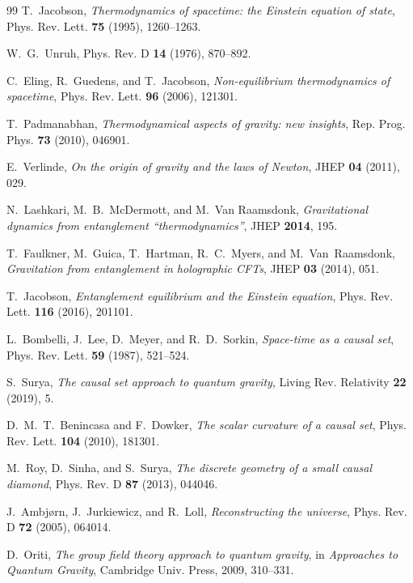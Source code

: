 \documentclass[11pt]{article}
\theoremstyle{definition}
\theoremstyle{remark}
\begin{document}
\begin{thebibliography}{99}\small
{}
T.~Jacobson, \emph{Thermodynamics of spacetime: the Einstein equation of state},
Phys. Rev. Lett. \textbf{75} (1995), 1260--1263.

W.~G.~Unruh,
Phys. Rev. D \textbf{14} (1976), 870--892.

C.~Eling, R.~Guedens, and T.~Jacobson,
\emph{Non-equilibrium thermodynamics of spacetime},
Phys. Rev. Lett. \textbf{96} (2006), 121301.

T.~Padmanabhan, \emph{Thermodynamical aspects of gravity: new insights},
Rep. Prog. Phys. \textbf{73} (2010), 046901.

E.~Verlinde, \emph{On the origin of gravity and the laws of Newton},
JHEP \textbf{04} (2011), 029.

N.~Lashkari, M.~B.~McDermott, and M.~Van Raamsdonk,
\emph{Gravitational dynamics from entanglement ``thermodynamics''},
JHEP \textbf{2014}, 195.

T.~Faulkner, M.~Guica, T.~Hartman, R.~C.~Myers, and M.~Van~Raamsdonk,
\emph{Gravitation from entanglement in holographic CFTs},
JHEP \textbf{03} (2014), 051.

T.~Jacobson, \emph{Entanglement equilibrium and the Einstein equation},
Phys. Rev. Lett. \textbf{116} (2016), 201101.

L.~Bombelli, J.~Lee, D.~Meyer, and R.~D.~Sorkin,
\emph{Space-time as a causal set},
Phys. Rev. Lett. \textbf{59} (1987), 521--524.

S.~Surya, \emph{The causal set approach to quantum gravity},
Living Rev. Relativity \textbf{22} (2019), 5.

D.~M.~T.~Benincasa and F.~Dowker,
\emph{The scalar curvature of a causal set},
Phys. Rev. Lett. \textbf{104} (2010), 181301.

M.~Roy, D.~Sinha, and S.~Surya,
\emph{The discrete geometry of a small causal diamond},
Phys. Rev. D \textbf{87} (2013), 044046.

J.~Ambj{\o}rn, J.~Jurkiewicz, and R.~Loll,
\emph{Reconstructing the universe}, Phys. Rev. D \textbf{72} (2005), 064014.

D.~Oriti, \emph{The group field theory approach to quantum gravity},
in \emph{Approaches to Quantum Gravity}, Cambridge Univ. Press, 2009, 310--331.


\end{thebibliography}
\end{document}
